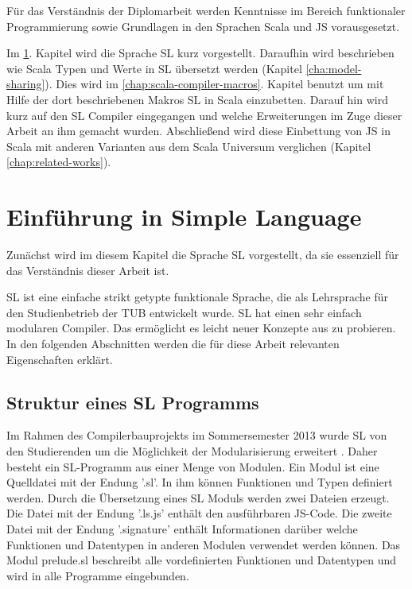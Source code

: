 \documentclass[12pt,bibtotoc]{scrreprt}
\begin{document}
Für das Verständnis der Diplomarbeit werden Kenntnisse im Bereich funktionaler Programmierung sowie Grundlagen in den Sprachen Scala und JS vorausgesetzt.

Im \ref{cha:sl-introduction}. Kapitel wird die Sprache SL kurz vorgestellt. Daraufhin wird beschrieben wie Scala Typen und Werte in SL übersetzt werden (Kapitel \ref{cha:model-sharing}). Dies wird im \ref{chap:scala-compiler-macros}. Kapitel benutzt um mit Hilfe der dort beschriebenen Makros SL in Scala einzubetten. Darauf hin wird kurz auf den SL Compiler eingegangen und welche Erweiterungen im Zuge dieser Arbeit an ihm gemacht wurden. Abschließend wird diese Einbettung von JS in Scala mit anderen Varianten aus dem Scala Universum verglichen (Kapitel \ref{chap:related-works}). 

\chapter{Einführung in Simple Language}
\label{cha:sl-introduction}

Zunächst wird im diesem Kapitel die Sprache SL vorgestellt, da sie essenziell für das Verständnis dieser Arbeit ist.

SL ist eine einfache strikt getypte funktionale Sprache, die als Lehrsprache für den Studienbetrieb der \ac{TUB} entwickelt wurde. SL hat einen sehr einfach modularen Compiler. Das ermöglicht es leicht neuer Konzepte aus zu probieren. In den folgenden Abschnitten werden die für diese Arbeit relevanten Eigenschaften erklärt.

\section{Struktur eines SL Programms}

Im Rahmen des Compilerbauprojekts im Sommersemester 2013 wurde SL von den Studierenden um die Möglichkeit der Modularisierung erweitert \cite{Bisping2013}. Daher besteht ein SL-Programm aus einer Menge von Modulen. Ein Modul ist eine Quelldatei mit der Endung '.sl'. In ihm können Funktionen und Typen definiert werden. Durch die Übersetzung eines SL Moduls werden zwei Dateien erzeugt. Die Datei mit der Endung '.ls.js' enthält den ausführbaren JS-Code. Die zweite Datei mit der Endung '.signature' enthält Informationen darüber welche Funktionen und Datentypen in anderen Modulen verwendet werden können. Das Modul prelude.sl beschreibt alle vordefinierten Funktionen und Datentypen und wird in alle Programme eingebunden. 
\end{document}
